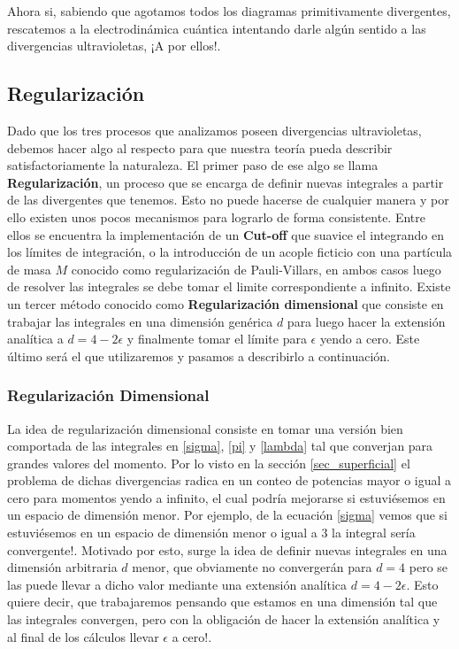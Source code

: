 \documentclass{article}
\numberwithin{equation}{section}
\begin{document}
Ahora si, sabiendo que agotamos todos los diagramas primitivamente divergentes, rescatemos a la electrodinámica cuántica intentando darle algún sentido a las divergencias ultravioletas, ¡A por ellos!.

\subsection{Regularización}

Dado que los tres procesos que analizamos poseen divergencias ultravioletas, debemos hacer algo al respecto para que nuestra teoría pueda describir satisfactoriamente la naturaleza. El primer paso de ese algo se llama \textbf{Regularización}, un proceso que se encarga de definir nuevas integrales a partir de las divergentes que tenemos. Esto no puede hacerse de cualquier manera y por ello existen unos pocos mecanismos para lograrlo de forma consistente. Entre ellos se encuentra la implementación de un \textbf{Cut-off} que suavice el integrando en los límites de integración, o la introducción de un acople ficticio con una partícula de masa $ M $ conocido como regularización de Pauli-Villars, en ambos casos luego de resolver las integrales se debe tomar el limite correspondiente a infinito. Existe un tercer método conocido como \textbf{Regularización dimensional} que consiste en trabajar las integrales en una dimensión genérica $ d $ para luego hacer la extensión analítica a $ d=4-2\epsilon $ y finalmente tomar el límite para $ \epsilon $ yendo a cero. Este último será el que utilizaremos y pasamos a describirlo a continuación.\\

\subsubsection{Regularización Dimensional}\label{sec_RD}

La idea de regularización dimensional consiste en tomar una versión bien comportada de las integrales en \ref{sigma}, \ref{pi} y \ref{lambda} tal que converjan para grandes valores del momento. Por lo visto en la sección \ref{sec_superficial} el problema de dichas divergencias radica en un conteo de potencias mayor o igual a cero para momentos yendo a infinito, el cual podría mejorarse si estuviésemos en un espacio de dimensión menor. Por ejemplo, de la ecuación \ref{sigma} vemos que si estuviésemos en un espacio de dimensión menor o igual a 3 la integral sería convergente!. Motivado por esto, surge la idea de definir nuevas integrales en una dimensión arbitraria $ d $ menor, que obviamente no convergerán para $ d=4 $ pero se las puede llevar a dicho valor mediante una extensión analítica $ d=4-2\epsilon $. Esto quiere decir, que trabajaremos pensando que estamos en una dimensión tal que las integrales convergen, pero con la obligación de hacer la extensión analítica y al final de los cálculos llevar $ \epsilon $ a cero!.\\
\end{document}
